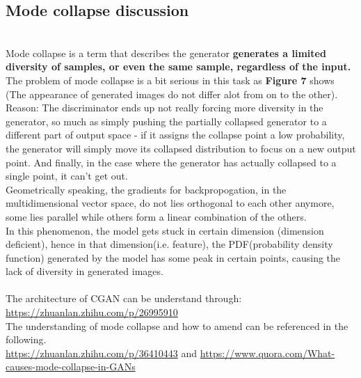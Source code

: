 \documentclass[11pt, a4paper]{article} %
\begin{document}
\subsection{Mode collapse discussion}
\\ Mode collapse is a term that describes the generator \textbf{generates a limited diversity of samples, or even the same sample, regardless of the input.}
\\ The problem of mode collapse is a bit serious in this task as \textbf{Figure 7} shows (The appearance of generated images do not differ alot from on to the other).
\\ Reason: The discriminator ends up not really forcing more diversity in the generator, so much as simply pushing the partially collapsed generator to a different part of output space - if it assigns the collapse point a low probability, the generator will simply move its collapsed distribution to focus on a new output point. And finally, in the case where the generator has actually collapsed to a single point, it can’t get out.
\\ Geometrically speaking, the gradients for backpropogation, in the multidimensional vector space, do not lies orthogonal to each other anymore, some lies parallel while others form a linear combination of the others.   
\\ In this phenomenon, the model gets stuck in certain dimension (dimension deficient), hence in that dimension(i.e. feature), the PDF(probability density function) generated by the model has some peak in certain points, causing the lack of diversity in generated images. 
\\
\\ The architecture of CGAN can be understand through: \url{https://zhuanlan.zhihu.com/p/26995910}
\\ The understanding of mode collapse and how to amend can be referenced in the following. 
\\ \url{https://zhuanlan.zhihu.com/p/36410443} and \url{https://www.quora.com/What-causes-mode-collapse-in-GANs}
\end{document}
